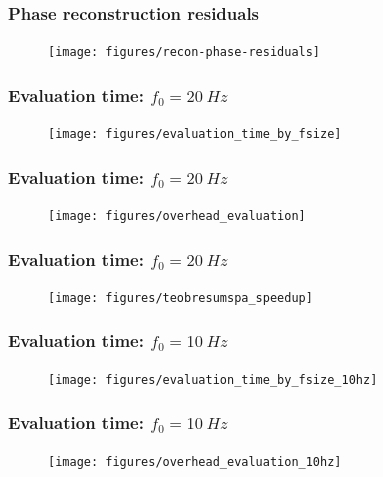 \documentclass{beamer}
\begin{document}
\begin{frame}
    \frametitle{Phase reconstruction residuals}
    \begin{figure}[ht]
    \centering
    \texttt{[image: figures/recon-phase-residuals]}
    \label{fig:recon-phase-residuals}
    \end{figure}
\end{frame}


\begin{frame}
    \frametitle{Evaluation time: \(f_0 = \SI{20}{Hz}\)}
    
    \begin{figure}[ht]
    \centering
    \texttt{[image: figures/evaluation\_time\_by\_fsize]}
    \label{fig:evaluation_time_by_fsize}
    \end{figure}
\end{frame}

\begin{frame}
    \frametitle{Evaluation time: \(f_0 = \SI{20}{Hz}\)}
    
    \begin{figure}[ht]
    \centering
    \texttt{[image: figures/overhead\_evaluation]}
    \label{fig:overhead_evaluation}
    \end{figure}
\end{frame}

\begin{frame}
    \frametitle{Evaluation time: \(f_0 = \SI{20}{Hz}\)}
    
    \begin{figure}[ht]
    \centering
    \texttt{[image: figures/teobresumspa\_speedup]}
    \label{fig:teobresumspa_speedup}
    \end{figure}
\end{frame}

\begin{frame}
    \frametitle{Evaluation time: \(f_0 = \SI{10}{Hz}\)}    
    \begin{figure}[ht]
    \centering
    \texttt{[image: figures/evaluation\_time\_by\_fsize\_10hz]}
    \label{fig:evaluation_time_by_fsize}
    \end{figure}
\end{frame}

\begin{frame}
    \frametitle{Evaluation time: \(f_0 = \SI{10}{Hz}\)}
    
    \begin{figure}[ht]
    \centering
    \texttt{[image: figures/overhead\_evaluation\_10hz]}
    \label{fig:overhead_evaluation}
    \end{figure}
\end{frame}
\end{document}
